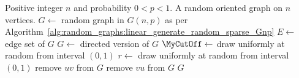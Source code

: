 
\begin{algorithmic}[1]
\Require Positive integer $n$ and probability $0 < p < 1$.
\Ensure A random oriented graph on $n$ vertices.
\State $G \gets$ random graph in $G(n,p)$ as per Algorithm~\ref{alg:random_graphs:linear_generate_random_sparse_Gnp}
\State $E \gets$ edge set of $G$
\State $G \gets$ directed version of $G$
\State $\MyCutOff \gets$ draw uniformly at random from interval $(0,1)$
  \State $r \gets$ draw uniformly at random from interval $(0,1)$
    \State remove $uv$ from $G$
  \Else
    \State remove $vu$ from $G$
  \EndIf
\EndFor
\State \Return $G$
\end{algorithmic}
